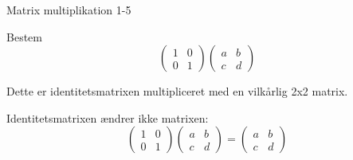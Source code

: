 \documentclass{article}
\begin{document}
\begin{exercise}{Matrix multiplikation 1-5}

Bestem
\[
\begin{pmatrix} 1 & 0 \\ 0 & 1 \end{pmatrix} \begin{pmatrix} a & b \\ c & d \end{pmatrix}
\]


\hint

Dette er identitetsmatrixen multipliceret med en vilkårlig 2x2 matrix.

\hint

Identitetsmatrixen ændrer ikke matrixen:
\[
\begin{pmatrix} 1 & 0 \\ 0 & 1 \end{pmatrix} \begin{pmatrix} a & b \\ c & d \end{pmatrix} = \begin{pmatrix} a & b \\ c & d \end{pmatrix}
\]

\end{exercise}
\end{document}
